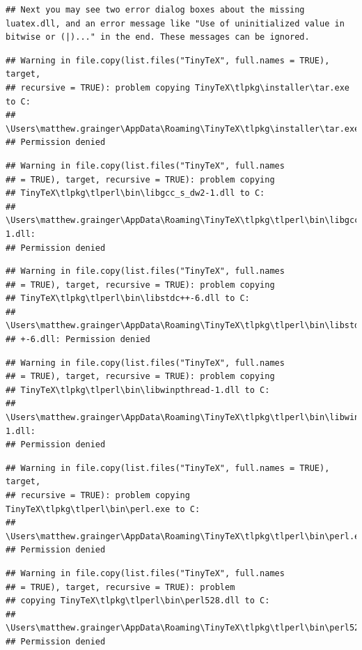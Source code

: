\documentclass[]{article}
\begin{document}
\begin{verbatim}
## Next you may see two error dialog boxes about the missing luatex.dll, and an error message like "Use of uninitialized value in bitwise or (|)..." in the end. These messages can be ignored.
\end{verbatim}

\begin{verbatim}
## Warning in file.copy(list.files("TinyTeX", full.names = TRUE), target,
## recursive = TRUE): problem copying TinyTeX\tlpkg\installer\tar.exe to C:
## \Users\matthew.grainger\AppData\Roaming\TinyTeX\tlpkg\installer\tar.exe:
## Permission denied
\end{verbatim}

\begin{verbatim}
## Warning in file.copy(list.files("TinyTeX", full.names
## = TRUE), target, recursive = TRUE): problem copying
## TinyTeX\tlpkg\tlperl\bin\libgcc_s_dw2-1.dll to C:
## \Users\matthew.grainger\AppData\Roaming\TinyTeX\tlpkg\tlperl\bin\libgcc_s_dw2-1.dll:
## Permission denied
\end{verbatim}

\begin{verbatim}
## Warning in file.copy(list.files("TinyTeX", full.names
## = TRUE), target, recursive = TRUE): problem copying
## TinyTeX\tlpkg\tlperl\bin\libstdc++-6.dll to C:
## \Users\matthew.grainger\AppData\Roaming\TinyTeX\tlpkg\tlperl\bin\libstdc+
## +-6.dll: Permission denied
\end{verbatim}

\begin{verbatim}
## Warning in file.copy(list.files("TinyTeX", full.names
## = TRUE), target, recursive = TRUE): problem copying
## TinyTeX\tlpkg\tlperl\bin\libwinpthread-1.dll to C:
## \Users\matthew.grainger\AppData\Roaming\TinyTeX\tlpkg\tlperl\bin\libwinpthread-1.dll:
## Permission denied
\end{verbatim}

\begin{verbatim}
## Warning in file.copy(list.files("TinyTeX", full.names = TRUE), target,
## recursive = TRUE): problem copying TinyTeX\tlpkg\tlperl\bin\perl.exe to C:
## \Users\matthew.grainger\AppData\Roaming\TinyTeX\tlpkg\tlperl\bin\perl.exe:
## Permission denied
\end{verbatim}

\begin{verbatim}
## Warning in file.copy(list.files("TinyTeX", full.names
## = TRUE), target, recursive = TRUE): problem
## copying TinyTeX\tlpkg\tlperl\bin\perl528.dll to C:
## \Users\matthew.grainger\AppData\Roaming\TinyTeX\tlpkg\tlperl\bin\perl528.dll:
## Permission denied
\end{verbatim}
\end{document}
